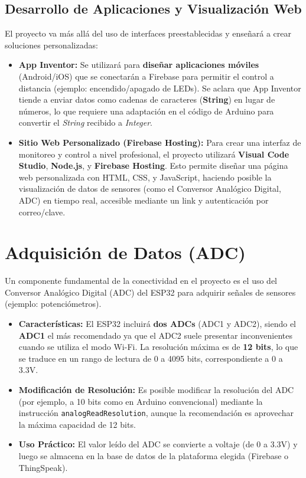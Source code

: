\documentclass{article}
\begin{document}
\subsection{Desarrollo de Aplicaciones y Visualización Web}
El proyecto va más allá del uso de interfaces preestablecidas y enseñará 
a crear soluciones personalizadas:
\begin{itemize}
    \item \textbf{App Inventor:} Se utilizará para 
    \textbf{diseñar aplicaciones móviles} (Android/iOS) que se conectarán 
    a Firebase para permitir el control a distancia 
    (ejemplo: encendido/apagado de LEDs). Se aclara que App Inventor 
    tiende a enviar datos como cadenas de caracteres (\textbf{String}) 
    en lugar de números, lo que requiere una adaptación en el código de 
    Arduino para convertir el \textit{String} recibido a 
    \textit{Integer}.
    \item \textbf{Sitio Web Personalizado (Firebase Hosting):} Para crear 
    una interfaz de monitoreo y control a nivel profesional, el 
    proyecto utilizará \textbf{Visual Code Studio}, \textbf{Node.js}, y 
    \textbf{Firebase Hosting}. Esto permite diseñar una página web 
    personalizada con HTML, CSS, y JavaScript, haciendo posible la 
    visualización de datos de sensores (como el Conversor Analógico 
    Digital, ADC) en tiempo real, accesible mediante un link y 
    autenticación por correo/clave.
\end{itemize}

\section{Adquisición de Datos (ADC)}

Un componente fundamental de la conectividad en el proyecto es el uso 
del Conversor Analógico Digital (ADC) del ESP32 para adquirir señales 
de sensores (ejemplo: potenciómetros).
\begin{itemize}
    \item \textbf{Características:} El ESP32 incluirá \textbf{dos ADCs} 
    (ADC1 y ADC2), siendo el \textbf{ADC1} el más recomendado ya que el 
    ADC2 suele presentar inconvenientes cuando se utiliza el modo Wi-Fi. 
    La resolución máxima es de \textbf{12 bits}, lo que se traduce 
    en un rango de lectura de 0 a 4095 bits, correspondiente a 0 a 3.3V.
    \item \textbf{Modificación de Resolución:} Es posible modificar la 
    resolución del ADC (por ejemplo, a 10 bits como en Arduino 
    convencional) mediante la instrucción \texttt{analogReadResolution}, 
    aunque la recomendación es aprovechar la máxima capacidad de 12 bits.
    \item \textbf{Uso Práctico:} El valor leído del ADC se convierte a 
    voltaje (de 0 a 3.3V) y luego se almacena en la base de datos de 
    la plataforma elegida (Firebase o ThingSpeak).
\end{itemize}
\end{document}
